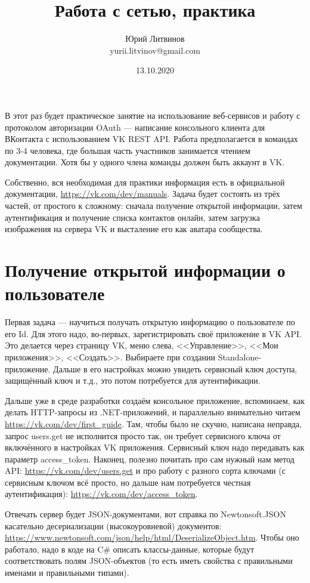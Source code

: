 \documentclass[a5paper]{article}
\title{Работа с сетью, практика}
\author{Юрий Литвинов\\\small{yurii.litvinov@gmail.com}}
\date{13.10.2020}
\begin{document}
\maketitle
\thispagestyle{empty}

В этот раз будет практическое занятие на использование веб-сервисов и работу с протоколом авторизации OAuth --- написание консольного клиента для ВКонтакта с использованием VK REST API. Работа предполагается в командах по 3-4 человека, где большая часть участников занимается чтением документации. Хотя бы у одного члена команды должен быть аккаунт в VK.

Собственно, вся необходимая для практики информация есть в официальной документации, \url{https://vk.com/dev/manuals}. Задача будет состоять из трёх частей, от простого к сложному: сначала получение открытой информации, затем аутентификация и получение списка контактов онлайн, затем загрузка изображения на сервера VK и высталение его как аватара сообщества.

\section{Получение открытой информации о пользователе}

Первая задача --- научиться получать открытую информацию о пользователе по его Id. Для этого надо, во-первых, зарегистрировать своё приложение в VK API. Это делается через страницу VK, меню слева, <<Управление>>, <<Мои приложения>>, <<Создать>>. Выбираете при создании Standalone-приложение. Дальше в его настройках можно увидеть сервисный ключ доступа, защищённый ключ и т.д., это потом потребуется для аутентификации.

Дальше уже в среде разработки создаём консольное приложение, вспоминаем, как делать HTTP-запросы из .NET-приложений, и параллельно внимательно читаем \url{https://vk.com/dev/first_guide}. Там, чтобы было не скучно, написана неправда, запрос users.get не исполнится просто так, он требует сервисного ключа от включённого в настройках VK приложения. Сервисный ключ надо передавать как параметр access\_token. Наконец, полезно почитать про сам нужный нам метод API: \url{https://vk.com/dev/users.get} и про работу с разного сорта ключами (с сервисным ключом всё просто, но дальше нам потребуется честная аутентификация): \url{https://vk.com/dev/access_token}.

Отвечать сервер будет JSON-документами, вот справка по Newtonsoft.JSON касательно десериализации (высокоуровневой) документов: \url{https://www.newtonsoft.com/json/help/html/DeserializeObject.htm}. Чтобы оно работало, надо в коде на C\# описать классы-данные, которые будут соответствовать полям JSON-объектов (то есть иметь свойства с правильными именами и правильными типами).
\end{document}
